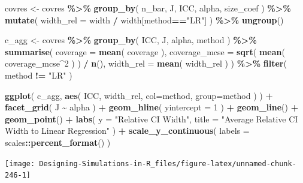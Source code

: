 \documentclass[
]{book}
\newenvironment{Shaded}{\begin{snugshade}}{\end{snugshade}}
\newcommand{\AttributeTok}[1]{\textcolor[rgb]{0.13,0.29,0.53}{#1}}
\newcommand{\DecValTok}[1]{\textcolor[rgb]{0.00,0.00,0.81}{#1}}
\newcommand{\FunctionTok}[1]{\textcolor[rgb]{0.13,0.29,0.53}{\textbf{#1}}}
\newcommand{\NormalTok}[1]{#1}
\newcommand{\OtherTok}[1]{\textcolor[rgb]{0.56,0.35,0.01}{#1}}
\newcommand{\SpecialCharTok}[1]{\textcolor[rgb]{0.81,0.36,0.00}{\textbf{#1}}}
\newcommand{\StringTok}[1]{\textcolor[rgb]{0.31,0.60,0.02}{#1}}
\begin{document}
\begin{Shaded}
\begin{Highlighting}[]
\NormalTok{covres }\OtherTok{\textless{}{-}}\NormalTok{ covres }\SpecialCharTok{\%\textgreater{}\%}
  \FunctionTok{group\_by}\NormalTok{( n\_bar, J, ICC, alpha, size\_coef ) }\SpecialCharTok{\%\textgreater{}\%}
  \FunctionTok{mutate}\NormalTok{( }\AttributeTok{width\_rel =}\NormalTok{ width }\SpecialCharTok{/}\NormalTok{ width[method}\SpecialCharTok{==}\StringTok{"LR"}\NormalTok{] ) }\SpecialCharTok{\%\textgreater{}\%}
  \FunctionTok{ungroup}\NormalTok{()}

\NormalTok{c\_agg }\OtherTok{\textless{}{-}}\NormalTok{ covres }\SpecialCharTok{\%\textgreater{}\%}
  \FunctionTok{group\_by}\NormalTok{( ICC, J, alpha, method ) }\SpecialCharTok{\%\textgreater{}\%}
  \FunctionTok{summarise}\NormalTok{( }\AttributeTok{coverage =} \FunctionTok{mean}\NormalTok{( coverage ),}
             \AttributeTok{coverage\_mcse =} \FunctionTok{sqrt}\NormalTok{( }\FunctionTok{mean}\NormalTok{( coverage\_mcse}\SpecialCharTok{\^{}}\DecValTok{2}\NormalTok{ ) ) }\SpecialCharTok{/} \FunctionTok{n}\NormalTok{(),}
             \AttributeTok{width\_rel =} \FunctionTok{mean}\NormalTok{( width\_rel ) ) }\SpecialCharTok{\%\textgreater{}\%}
  \FunctionTok{filter}\NormalTok{( method }\SpecialCharTok{!=} \StringTok{"LR"}\NormalTok{ )}
  
\FunctionTok{ggplot}\NormalTok{( c\_agg, }\FunctionTok{aes}\NormalTok{( ICC, width\_rel, }\AttributeTok{col=}\NormalTok{method, }\AttributeTok{group=}\NormalTok{method ) ) }\SpecialCharTok{+}
  \FunctionTok{facet\_grid}\NormalTok{( J }\SpecialCharTok{\textasciitilde{}}\NormalTok{ alpha ) }\SpecialCharTok{+}
  \FunctionTok{geom\_hline}\NormalTok{( }\AttributeTok{yintercept =} \DecValTok{1}\NormalTok{ ) }\SpecialCharTok{+}
  \FunctionTok{geom\_line}\NormalTok{() }\SpecialCharTok{+} \FunctionTok{geom\_point}\NormalTok{() }\SpecialCharTok{+}
  \FunctionTok{labs}\NormalTok{( }\AttributeTok{y =} \StringTok{"Relative CI Width"}\NormalTok{,}
        \AttributeTok{title =} \StringTok{"Average Relative CI Width to Linear Regression"}\NormalTok{ ) }\SpecialCharTok{+}
  \FunctionTok{scale\_y\_continuous}\NormalTok{( }\AttributeTok{labels =}\NormalTok{ scales}\SpecialCharTok{::}\FunctionTok{percent\_format}\NormalTok{() )}
\end{Highlighting}
\end{Shaded}

\begin{center}\texttt{[image: Designing-Simulations-in-R\_files/figure-latex/unnamed-chunk-246-1]} \end{center}
\end{document}
